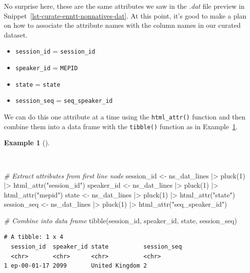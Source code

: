 \documentclass[
  letterpaper,
]{latex/krantz}
\newenvironment{Shaded}{\begin{snugshade}}{\end{snugshade}}
\newcommand{\CommentTok}[1]{\textcolor[rgb]{0.00,0.00,0.00}{\textit{#1}}}
\newcommand{\DecValTok}[1]{\textcolor[rgb]{0.00,0.00,0.00}{#1}}
\newcommand{\FunctionTok}[1]{\textcolor[rgb]{0.00,0.00,0.00}{#1}}
\newcommand{\NormalTok}[1]{\textcolor[rgb]{0.00,0.00,0.00}{#1}}
\newcommand{\OtherTok}[1]{\textcolor[rgb]{0.00,0.00,0.00}{#1}}
\newcommand{\SpecialCharTok}[1]{\textcolor[rgb]{0.00,0.00,0.00}{#1}}
\newcommand{\StringTok}[1]{\textcolor[rgb]{0.00,0.00,0.00}{#1}}
\providecommand{\tightlist}{%
  \setlength{\itemsep}{0pt}\setlength{\parskip}{0pt}}\usepackage{longtable,booktabs,array}
\theoremstyle{definition}
\newtheorem{example}{Example}[chapter]
\theoremstyle{remark}
\begin{document}
No surprise here, these are the same attributes we saw in the
\emph{.dat} file preview in
Snippet~\ref{lst-curate-enntt-nonnatives-dat}. At this point, it's good
to make a plan on how to associate the attribute names with the column
names in our curated dataset.

\begin{itemize}
\tightlist
\item
  \texttt{session\_id} = \texttt{session\_id}
\item
  \texttt{speaker\_id} = \texttt{MEPID}
\item
  \texttt{state} = \texttt{state}
\item
  \texttt{session\_seq} = \texttt{seq\_speaker\_id}
\end{itemize}

We can do this one attribute at a time using the \texttt{html\_attr()}
function and then combine them into a data frame with the
\texttt{tibble()} function as in
Example~\ref{exm-curate-enntt-extract-attributes}.

\begin{example}[]\protect\hypertarget{exm-curate-enntt-extract-attributes}{}\label{exm-curate-enntt-extract-attributes}

~

\begin{Shaded}
\begin{Highlighting}[]
\CommentTok{\# Extract attributes from first line node}
\NormalTok{session\_id }\OtherTok{\textless{}{-}}\NormalTok{ ns\_dat\_lines }\SpecialCharTok{|\textgreater{}} \FunctionTok{pluck}\NormalTok{(}\DecValTok{1}\NormalTok{) }\SpecialCharTok{|\textgreater{}} \FunctionTok{html\_attr}\NormalTok{(}\StringTok{"session\_id"}\NormalTok{)}
\NormalTok{speaker\_id }\OtherTok{\textless{}{-}}\NormalTok{ ns\_dat\_lines }\SpecialCharTok{|\textgreater{}} \FunctionTok{pluck}\NormalTok{(}\DecValTok{1}\NormalTok{) }\SpecialCharTok{|\textgreater{}} \FunctionTok{html\_attr}\NormalTok{(}\StringTok{"mepid"}\NormalTok{)}
\NormalTok{state }\OtherTok{\textless{}{-}}\NormalTok{ ns\_dat\_lines }\SpecialCharTok{|\textgreater{}} \FunctionTok{pluck}\NormalTok{(}\DecValTok{1}\NormalTok{) }\SpecialCharTok{|\textgreater{}} \FunctionTok{html\_attr}\NormalTok{(}\StringTok{"state"}\NormalTok{)}
\NormalTok{session\_seq }\OtherTok{\textless{}{-}}\NormalTok{ ns\_dat\_lines }\SpecialCharTok{|\textgreater{}} \FunctionTok{pluck}\NormalTok{(}\DecValTok{1}\NormalTok{) }\SpecialCharTok{|\textgreater{}} \FunctionTok{html\_attr}\NormalTok{(}\StringTok{"seq\_speaker\_id"}\NormalTok{)}

\CommentTok{\# Combine into data frame}
\FunctionTok{tibble}\NormalTok{(session\_id, speaker\_id, state, session\_seq)}
\end{Highlighting}
\end{Shaded}

\begin{verbatim}
# A tibble: 1 x 4
  session_id  speaker_id state          session_seq
  <chr>       <chr>      <chr>          <chr>      
1 ep-00-01-17 2099       United Kingdom 2          
\end{verbatim}

\end{example}
\end{document}
